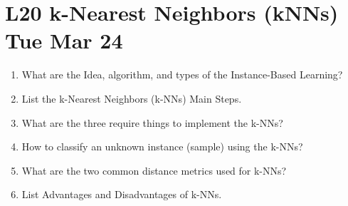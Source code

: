 \documentclass[12pt]{article}
\newenvironment{QandA}{\begin{enumerate}[label=\bfseries\arabic*.]\bfseries}
{\end{enumerate}}
\newenvironment{answered}{\par\normalfont\color{Sepia}}{}
\begin{document}
\section*{L20 k-Nearest Neighbors (kNNs) \textemdash{} Tue Mar 24}
\begin{QandA} 
    \item What are the Idea, algorithm, and types of the Instance-Based Learning?
    \begin{answered}
    \end{answered}

    \item List the k-Nearest Neighbors (k-NNs) Main Steps.
    \begin{answered}
    \end{answered}

    \item What are the three require things to implement the k-NNs?
    \begin{answered}
    \end{answered}

    \item How to classify an unknown instance (sample) using the k-NNs?
    \begin{answered}
    \end{answered}

    \item What are the two common distance metrics used for k-NNs?
    \begin{answered}
    \end{answered}

    \item List Advantages and Disadvantages of k-NNs.
    \begin{answered}
    \end{answered}

\end{QandA}
\end{document}
